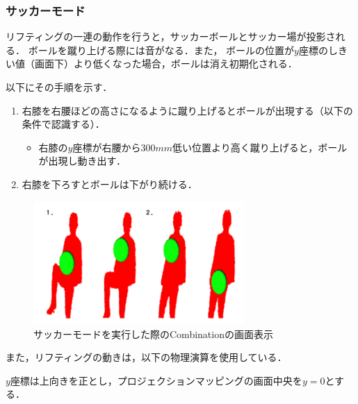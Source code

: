 \subsubsection{サッカーモード}
リフティングの一連の動作を行うと，サッカーボールとサッカー場が投影される．
ボールを蹴り上げる際には音がなる．また，
ボールの位置が$y$座標のしきい値（画面下）より低くなった場合，ボールは消え初期化される．

以下にその手順を示す．

\begin{enumerate}
    \item 右膝を右腰ほどの高さになるように蹴り上げるとボールが出現する（以下の条件で認識する）．
        \begin{itemize}
            \item 右膝の$y$座標が右腰から$300mm$低い位置より高く蹴り上げると，ボールが出現し動き出す．            
        \end{itemize}
    \item 右膝を下ろすとボールは下がり続ける．
\end{enumerate}


\begin{figure}[b]
    \centering
    \includegraphics[width=8cm]{image/soccer.png}
    \caption{サッカーモードを実行した際のCombinationの画面表示}
  \label{baseball}
\end{figure}

\clearpage

また，リフティングの動きは，以下の物理演算を使用している．

$y$座標は上向きを正とし，プロジェクションマッピングの画面中央を$y=0$とする．



